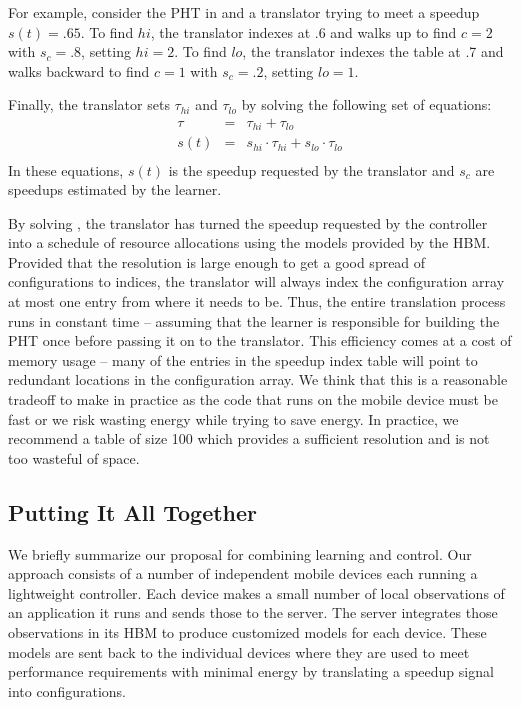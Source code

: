 For example, consider the PHT in  and a translator trying
to meet a speedup $s(t) = .65$.  To find $hi$, the translator indexes
at .6 and walks up to find $c=2$ with $s_c=.8$, setting $hi = 2$.  To
find $lo$, the translator indexes the table at .7 and walks backward
to find $c=1$ with $s_c=.2$, setting $lo = 1$.

Finally, the translator sets $\tau_{hi}$ and $\tau_{lo}$ by solving the
following set of equations:
\begin{eqnarray}
  \tau &=& \tau_{hi} + \tau_{lo}    \label{eqn:s1} \\
  s(t) &=& s_{hi} \cdot \tau_{hi} + s_{lo} \cdot \tau_{lo} \label{eqn:s2} \\
\end{eqnarray}
In these equations, $s(t)$ is the speedup requested by the translator
and $s_c$ are speedups estimated by the learner. 

By solving , the translator has turned the speedup
requested by the controller into a schedule of resource allocations
using the models provided by the HBM.  Provided that the resolution is
large enough to get a good spread of configurations to indices, the
translator will always index the configuration array at most one entry
from where it needs to be.  Thus, the entire translation process runs
in constant time -- assuming that the learner is responsible for
building the PHT once before passing it on to the translator.  This
efficiency comes at a cost of memory usage -- many of the entries in
the speedup index table will point to redundant locations in the
configuration array.  We think that this is a reasonable tradeoff to
make in practice as the code that runs on the mobile device must be
fast or we risk wasting energy while trying to save energy.  In
practice, we recommend a table of size 100 which provides a sufficient
resolution and is not too wasteful of space.


\subsection{Putting It All Together}
We briefly summarize our proposal for combining learning and control.
Our approach consists of a number of independent mobile devices each
running a lightweight controller.  Each device makes a small number of
local observations of an application it runs and sends those to the
server.  The server integrates those observations in its HBM to
produce customized models for each device.  These models are sent back
to the individual devices where they are used to meet performance
requirements with minimal energy by translating a speedup signal into
configurations.








